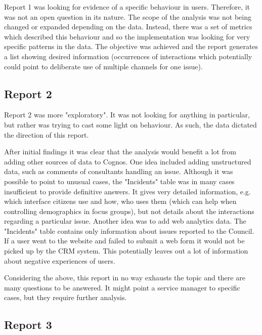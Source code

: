 Report 1 was looking for evidence of a specific behaviour in users. Therefore, it was not an open question in its nature. The scope of the analysis was not being changed or expanded depending on the data. Instead, there was a set of metrics which described this behaviour and so the implementation was looking for very specific patterns in the data. The objective was achieved and the report generates a list showing desired information (occurrences of interactions which potentially could point to deliberate use of multiple channels for one issue).
		
		\subsection{Report 2}
		
Report 2 was more "exploratory". It was not looking for anything in particular, but rather was trying to cast some light on behaviour. As such, the data dictated the direction of this report.

After initial findings it was clear that the analysis would benefit a lot from adding other sources of data to Cognos. One idea included adding unstructured data, such as comments of consultants handling an issue. Although it was possible to point to unusual cases, the "Incidents" table was in many cases insufficient to provide definitive answers. It gives very detailed information, e.g. which interface citizens use and how, who uses them (which can help when controlling demographics in focus groups), but not details about the interactions regarding a particular issue. Another idea was to add web analytics data. The "Incidents" table contains only information about issues reported to the Council. If a user went to the website and failed to submit a web form it would not be picked up by the CRM system. This potentially leaves out a lot of information about negative experiences of users.

Considering the above, this report in no way exhausts the topic and there are many questions to be answered. It might point a service manager to specific cases, but they require further analysis.
		
		\subsection{Report 3}
		

